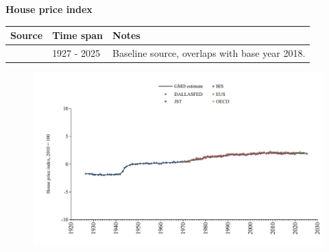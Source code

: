 \documentclass[12pt,a4paper,landscape]{article}
\begin{document}
\begin{adjustbox}{max totalsize={\paperwidth}{\paperheight},center}
\begin{minipage}[t][\textheight][t]{\textwidth}
\vspace*{0.5cm}
{}
\begin{center}
{\Large\bfseries House price index}
\end{center}
\vspace{0.5cm}
\begin{table}[H]
\centering
\small
\begin{tabular}{|l|l|l|}
\hline
\textbf{Source} & \textbf{Time span} & \textbf{Notes} \\
\hline
\rowcolor{white}\cite{BIS}& 1927 - 2025 &Baseline source, overlaps with base year 2018. \\
\hline
\end{tabular}
\end{table}
\begin{figure}[H]
\centering
\includegraphics[width=\textwidth,height=0.6\textheight,keepaspectratio]{graphs/ITA_HPI.pdf}
\end{figure}
\end{minipage}
\end{adjustbox}
\end{document}
